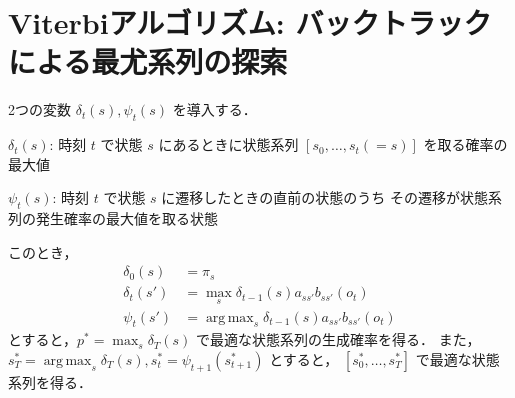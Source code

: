 \documentclass[a4paper, lualatex, ja=standard]{bxjsarticle}
\DeclareMathOperator*{\argmax}{arg\,max}
\begin{document}
\section{Viterbiアルゴリズム: バックトラックによる最尤系列の探索}

2つの変数 $\delta_{t}(s), \psi_{t}(s)$ を導入する．
\begin{dfntcb}
$\delta_{t}(s)$: 時刻 $t$ で状態 $s$ にあるときに状態系列
$[s_{0},\dots,s_{t}(=s)]$ を取る確率の最大値

$\psi_{t}(s)$: 時刻 $t$ で状態 $s$ に遷移したときの直前の状態のうち
その遷移が状態系列の発生確率の最大値を取る状態
\end{dfntcb}

このとき，
\begin{align*}
\delta_{0}(s) &=\pi_{s} \\
\delta_{t}(s') &= \max_{s}\delta_{t-1}(s)a_{ss'}b_{ss'}(o_{t}) \\
\psi_{t}(s') &=\argmax_{s}\delta_{t-1}(s)a_{ss'}b_{ss'}(o_{t})
\end{align*}
とすると，$p^{*}=\max_{s}\delta_{T}(s)$ で最適な状態系列の生成確率を得る．
また，$s^{*}_{T}=\argmax_{s}\delta_{T}(s), s^{*}_{t}=\psi_{t+1}(s^{*}_{t+1})$ とすると，
$[s^{*}_{0},\dots,s^{*}_{T}]$ で最適な状態系列を得る．
\end{document}
